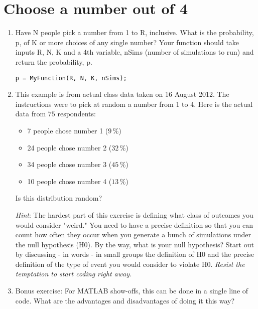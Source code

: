 \documentclass[pdflatex]{article}
\begin{document}
\section*{Choose a number out of 4}

\begin{enumerate}
\item
Have N people pick a number from 1 to R, inclusive. What is the probability, p, of K or more choices of any single number? Your function should take inputs R, N, K and a 4th variable, nSims (number of simulations to run) and return the probability, p.

\verb_p = MyFunction(R, N, K, nSims);_
\item
This example is from actual class data taken on 16 August 2012. The instructions were to pick at random a number from \(1\) to \(4\). Here is the actual data from \(75\) respondents:

\begin{itemize}
\item
7 people chose number 1 (\(9\,\%\))
\item
24 people chose number 2 (\(32\,\%\))
\item
34 people chose number 3 (\(45\,\%\))
\item
10 people chose number 4 (\(13\,\%\))
\end{itemize}

Is this distribution random?

\emph{Hint}: The hardest part of this exercise is defining what class of outcomes you would consider "weird." You need to have a precise definition so that you can count how often they occur when you generate a bunch of simulations under the null hypothesis (H0). By the way, what is your null hypothesis? Start out by discussing - in words - in small groups the definition of H0 and the precise definition of the type of event you would consider to violate H0. \emph{Resist the temptation to start coding right away.}

\item
Bonus exercise: For MATLAB show-offs, this can be done in a single line of code. What are the advantages and disadvantages of doing it this way?

\end{enumerate}
\end{document}
